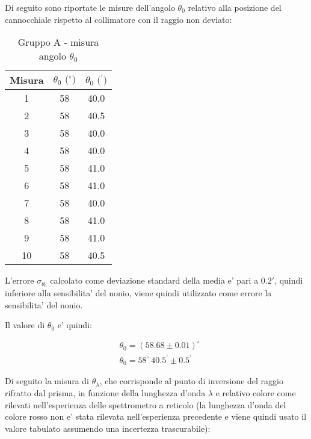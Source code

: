 Di seguito sono riportate le misure dell'angolo $\theta_0$ relativo alla posizione del cannocchiale rispetto al collimatore con il raggio non deviato:
\begin{table}[!htbp]
    {\par\centering
    \begin{tabular}{ccc}
        \hline
        Misura & $\theta_0 \text{ ($^{\circ}$)}$ & $\theta_0 \text{ ($^{\prime}$)}$ \\
        \hline
        1   &   58 &   40.0\\
        2   &   58 &   40.5\\
        3   &   58 &   40.0\\
        4   &   58 &   40.0\\
        5   &   58 &   41.0\\
        6   &   58 &   41.0\\
        7   &   58 &   40.0\\
        8   &   58 &   41.0\\
        9   &   58 &   41.0\\
        10  &   58 &   40.5\\
        \hline
    \end{tabular}
    \par}
    \caption{Gruppo A - misura angolo $\theta_0$}
\end{table}

L'errore $\sigma_{\theta_0}$ calcolato come deviazione standard della media e' pari a $0.2{\prime}$, quindi inferiore alla sensibilita' del nonio, viene quindi utilizzato come errore la sensibilita' del nonio.

Il valore di $\theta_0$ e' quindi:

    \begin{align*}
        &\theta_0 = (58.68 \pm 0.01)^{\circ} \\
        &\theta_0 = 58^{\circ} \ 40.5^{\prime} \pm 0.5^{\prime}
    \end{align*}


Di seguito la misura di $\theta_{\lambda}$, che corrisponde al punto di inversione del raggio rifratto dal prisma, in funzione della lunghezza d'onda $\lambda$ e relativo colore come rilevati nell'esperienza delle spettrometro a reticolo (la lunghezza d'onda del colore rosso non e' stata rilevata nell'esperienza precedente e viene quindi usato il valore tabulato assumendo una incertezza trascurabile):

